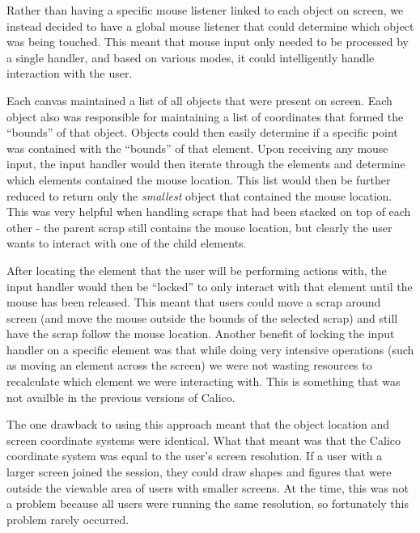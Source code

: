 Rather than having a specific mouse listener linked to each object on screen, we instead decided to have a global mouse listener that could determine which object was being touched. This meant that mouse input only needed to be processed by a single handler, and based on various modes, it could intelligently handle interaction with the user. 

Each canvas maintained a list of all objects that were present on screen. Each object also was responsible for maintaining a list of coordinates that formed the ``bounds'' of that object. Objects could then easily determine if a specific point was contained with the ``bounds'' of that element.
Upon receiving any mouse input, the input handler would then iterate through the elements and determine which elements contained the mouse location. This list would then be further reduced to return only the \emph{smallest} object that contained the mouse location. This was very helpful when handling scraps that had been stacked on top of each other - the parent scrap still contains the mouse location, but clearly the user wants to interact with one of the child elements.

After locating the element that the user will be performing actions with, the input handler would then be ``locked'' to only interact with that element until the mouse has been released. This meant that users could move a scrap around screen (and move the mouse outside the bounds of the selected scrap) and still have the scrap follow the mouse location. Another benefit of locking the input handler on a specific element was that while doing very intensive operations (such as moving an element across the screen) we were not wasting resources to recalculate which element we were interacting with. This is something that was not availble in the previous versions of Calico.

The one drawback to using this approach meant that the object location and screen coordinate systems were identical. What that meant was that the Calico coordinate system was equal to the user's screen resolution. If a user with a larger screen joined the session, they could draw shapes and figures that were outside the viewable area of users with smaller screens. At the time, this was not a problem because all users were running the same resolution, so fortunately this problem rarely occurred.

